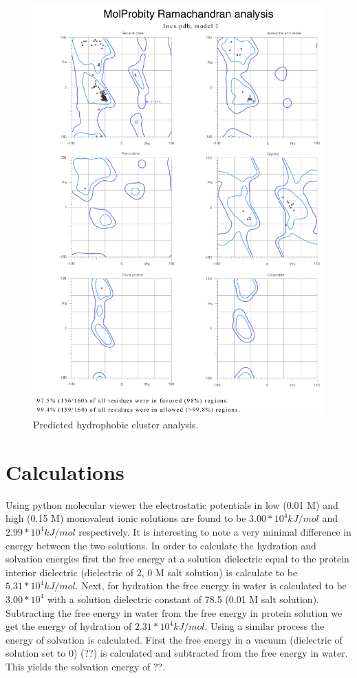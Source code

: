 \documentclass[12pt]{article}
\begin{document}
\begin{figure}[h]
	\centering
	\includegraphics[width=.95\linewidth]{ramachandran.png}
	
	\caption{Predicted hydrophobic cluster analysis.}
	\label{ramchan}
\end{figure}
\section{Calculations}

Using python molecular viewer the electrostatic potentials in low (0.01 M) and high (0.15 M) monovalent ionic solutions are found to be $3.00*10^4 kJ/mol$ and $2.99*10^4 kJ/mol$ respectively. It is interesting to note a very minimal difference in energy between the two solutions. In order to calculate the hydration and solvation energies first the free energy at a solution dielectric equal to the protein interior dielectric (dielectric of 2, 0 M salt solution) is calculate to be $5.31 *10^4 kJ/mol$. Next, for hydration the free energy in water is calculated to be $3.00*10^4$ with a solution dielectric constant of 78.5 (0.01 M salt solution). Subtracting the free energy in water from the free energy in protein solution we get the energy of hydration of $2.31*10^4 kJ/mol$. Using a similar process the energy of solvation is calculated. First the free energy in a vacuum (dielectric of solution set to 0) (??) is calculated and subtracted from the free energy in water. This yields the solvation energy of ??.
\end{document}
